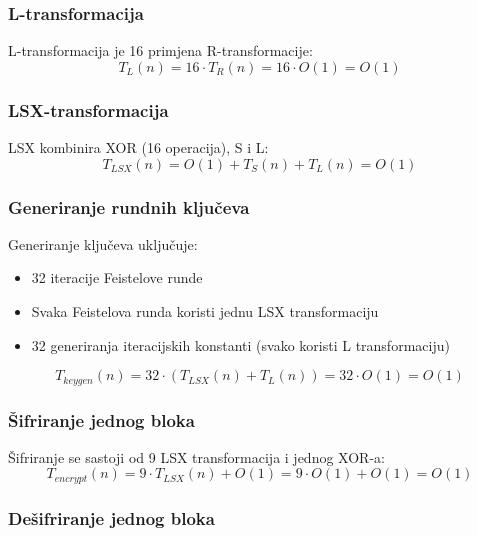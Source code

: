 \documentclass[12pt,a4paper]{article}
\begin{document}
\subsubsection{L-transformacija}

L-transformacija je 16 primjena R-transformacije:
\begin{equation}
    T_L(n) = 16 \cdot T_R(n) = 16 \cdot O(1) = O(1)
\end{equation}

\subsubsection{LSX-transformacija}

LSX kombinira XOR (16 operacija), S i L:
\begin{equation}
    T_{LSX}(n) = O(1) + T_S(n) + T_L(n) = O(1)
\end{equation}

\subsubsection{Generiranje rundnih ključeva}

Generiranje ključeva uključuje:
\begin{itemize}
    \item 32 iteracije Feistelove runde
    \item Svaka Feistelova runda koristi jednu LSX transformaciju
    \item 32 generiranja iteracijskih konstanti (svako koristi L transformaciju)
\end{itemize}

\begin{equation}
    T_{keygen}(n) = 32 \cdot (T_{LSX}(n) + T_L(n)) = 32 \cdot O(1) = O(1)
\end{equation}

\subsubsection{Šifriranje jednog bloka}

Šifriranje se sastoji od 9 LSX transformacija i jednog XOR-a:
\begin{equation}
    T_{encrypt}(n) = 9 \cdot T_{LSX}(n) + O(1) = 9 \cdot O(1) + O(1) = O(1)
\end{equation}

\subsubsection{Dešifriranje jednog bloka}
\end{document}
